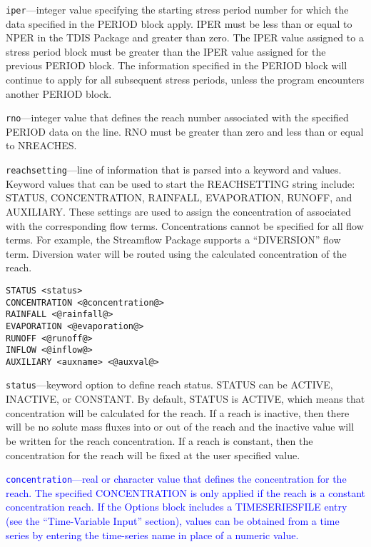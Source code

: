 \begin{description}
\item \texttt{iper}---integer value specifying the starting stress period number for which the data specified in the PERIOD block apply.  IPER must be less than or equal to NPER in the TDIS Package and greater than zero.  The IPER value assigned to a stress period block must be greater than the IPER value assigned for the previous PERIOD block.  The information specified in the PERIOD block will continue to apply for all subsequent stress periods, unless the program encounters another PERIOD block.

\item \texttt{rno}---integer value that defines the reach number associated with the specified PERIOD data on the line. RNO must be greater than zero and less than or equal to NREACHES.

\item \texttt{reachsetting}---line of information that is parsed into a keyword and values.  Keyword values that can be used to start the REACHSETTING string include: STATUS, CONCENTRATION, RAINFALL, EVAPORATION, RUNOFF, and AUXILIARY.  These settings are used to assign the concentration of associated with the corresponding flow terms.  Concentrations cannot be specified for all flow terms.  For example, the Streamflow Package supports a ``DIVERSION'' flow term.  Diversion water will be routed using the calculated concentration of the reach.

\begin{lstlisting}[style=blockdefinition]
STATUS <status>
CONCENTRATION <@concentration@>
RAINFALL <@rainfall@>
EVAPORATION <@evaporation@>
RUNOFF <@runoff@>
INFLOW <@inflow@>
AUXILIARY <auxname> <@auxval@> 
\end{lstlisting}

\item \texttt{status}---keyword option to define reach status.  STATUS can be ACTIVE, INACTIVE, or CONSTANT. By default, STATUS is ACTIVE, which means that concentration will be calculated for the reach.  If a reach is inactive, then there will be no solute mass fluxes into or out of the reach and the inactive value will be written for the reach concentration.  If a reach is constant, then the concentration for the reach will be fixed at the user specified value.

\item \textcolor{blue}{\texttt{concentration}---real or character value that defines the concentration for the reach. The specified CONCENTRATION is only applied if the reach is a constant concentration reach. If the Options block includes a TIMESERIESFILE entry (see the ``Time-Variable Input'' section), values can be obtained from a time series by entering the time-series name in place of a numeric value.}


\end{description}
